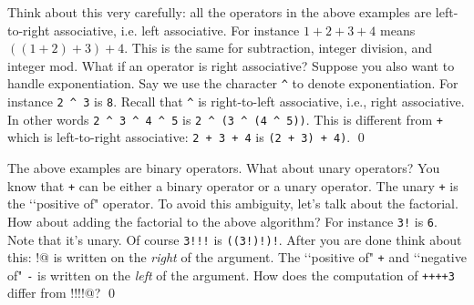 \begin{ex}
  Think about this very carefully:
  all the operators in the above examples are left-to-right associative,
  i.e. left associative. For instance $1 + 2 + 3 + 4$ means
  $((1 + 2) + 3) + 4$.
  This is the same for subtraction, integer division, and integer mod.
  What if an operator is right associative?
  Suppose you also want to handle exponentiation.
  Say we use the character \verb!^! to denote exponentiation.
  For instance \verb!2 ^ 3! is \verb!8!.
  Recall that \verb!^! is right-to-left associative, i.e.,
  right associative.
  In other words
  \verb!2 ^ 3 ^ 4 ^ 5!
  is \verb!2 ^ (3 ^ (4 ^ 5))!.
  This is different from \verb!+! which is left-to-right associative:
  \verb!2 + 3 + 4!
  is \verb!(2 + 3) + 4)!.
\qed
\end{ex}

  
\begin{ex}
  The above examples are binary operators.
  What about unary operators?
  You know that \verb!+! can be either a binary operator
  or a unary operator.
  The unary \verb!+! is the \lq\lq positive of" operator.
  To avoid this ambiguity, let's talk about the factorial.
  How about adding the factorial to the above algorithm?
  For instance \texttt{3!} is \texttt{6}.
  Note that it's unary.
  Of course
  \texttt{3!!!} is \texttt{((3!)!)!}.
  After you are done think about this:
  \verb@!@ is written on the \textit{right} of the argument.
  The
  \lq\lq positive of" \verb!+!
  and
  \lq\lq negative of" \verb!-!
  is written on the \textit{left} of the argument.
  How does the computation of \verb!++++3!
  differ from !!!!@?
\qed
\end{ex}


